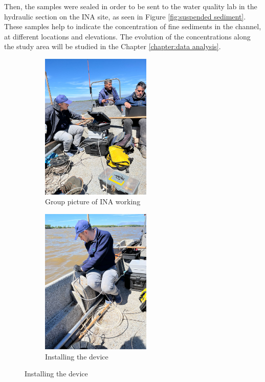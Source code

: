 Then, the samples were sealed in order to be sent to the water quality lab in the hydraulic section on the INA site, as seen in Figure \ref{fig:suspended sediment}. These samples help to indicate the concentration of fine sediments in the channel, at different locations and elevations. The evolution of the concentrations along the study area will be studied in the Chapter \ref{chapter:data analysis}.

\begin{figure}[H]
    \centering
    \begin{subfigure}[a]{0.48\textwidth}
        \includegraphics[width=\linewidth, height=7cm]{figures/ch4/group.jpg}
        \caption{Group picture of INA working}
    \end{subfigure}
    \hfill
    \begin{subfigure}[b]{0.48\textwidth}
        \includegraphics[width=\linewidth, height=7cm]{figures/ch4/installing.jpg}
        \caption{Installing the device}
        
    \end{subfigure}

    \vspace{0.5cm}


\end{figure}
